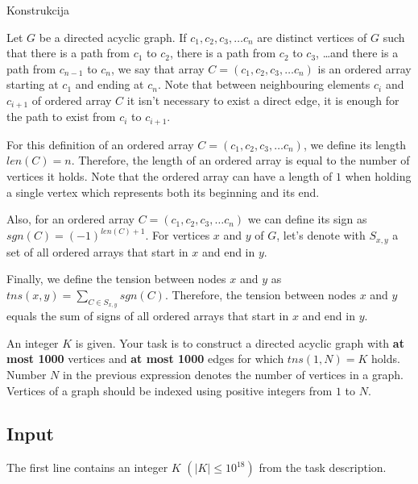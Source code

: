 \begin{statement}[
  problempoints=110,
  timelimit=1 sekunda,
  memorylimit=512 MiB,
]{Konstrukcija}



Let $G$ be a directed acyclic graph. If $c_1, c_2, c_3, \dots c_n$ are distinct
vertices of $G$ such that there is a path from $c_1$ to $c_2$, there is a
path from $c_2$ to $c_3$, \dots and there is a path from $c_{n-1}$ to $c_n$,
we say that array $C = (c_1, c_2, c_3, \dots c_n)$ is an ordered array
starting at $c_1$ and ending at $c_n$. Note that between neighbouring
elements $c_i$ and $c_{i+1}$ of ordered array $C$ it isn't necessary to exist
a direct edge, it is enough for the path to exist from $c_i$ to $c_{i+1}$.

For this definition of an ordered array $C = (c_1, c_2, c_3, \dots c_n)$, we
define its length $len(C) = n$.  Therefore, the length of an ordered array
is equal to the number of vertices it holds. Note that the ordered array
can have a length of $1$ when holding a single vertex which represents both
its beginning and its end.

Also, for an ordered array $C = (c_1, c_2, c_3, \dots c_n)$ we can define its
sign as $sgn(C) = (-1)^{len(C)+1}$.  For vertices $x$ and $y$ of
$G$, let's denote with $S_{x,y}$ a set of all ordered arrays that start in $x$
and end in $y$.

Finally, we define the tension between nodes $x$ and $y$ as $tns(x, y)=\sum_{C \in
S_{x, y}}{sgn(C)}$. Therefore, the tension between nodes $x$ and $y$ equals the
sum of signs of all ordered arrays that start in $x$ and end in $y$.

An integer $K$ is given. Your task is to construct a directed acyclic graph
with \textbf{at most 1000} vertices and \textbf{at most 1000} edges for
which $tns(1, N) = K$ holds. Number $N$ in the previous expression denotes
the number of vertices in a graph. Vertices of a graph should be indexed
using positive integers from $1$ to $N$.

\subsection*{Input}
The first line contains an integer $K$ $(|K| \le 10^{18})$ from the
task description.


\end{statement}
